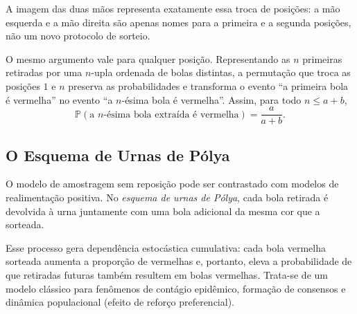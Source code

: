 \documentclass[12pt,portuguese]{article}
\let\leq\leqslant
\theoremstyle{definition}
\begin{document}
A imagem das duas mãos representa exatamente essa troca de posições: a mão esquerda e a mão direita são apenas nomes para a primeira e a segunda posições, não um novo protocolo de sorteio.

O mesmo argumento vale para qualquer posição. Representando as \(n\) primeiras retiradas por uma \(n\)-upla ordenada de bolas distintas, a permutação que troca as posições \(1\) e \(n\) preserva as probabilidades e transforma o evento ``a primeira bola é vermelha'' no evento ``a \(n\)-ésima bola é vermelha''. Assim, para todo \(n\leq a+b\),
\begin{equation}
  \mathbb{P}(\text{a } n\text{-ésima bola extraída é vermelha}) = \frac{a}{a+b}.
\end{equation}

\subsection{O Esquema de Urnas de Pólya}

O modelo de amostragem sem reposição pode ser contrastado com modelos de realimentação positiva. No \emph{esquema de urnas de Pólya}, cada bola retirada é devolvida à urna juntamente com 
uma bola adicional da mesma cor que a sorteada.

Esse processo gera dependência estocástica cumulativa: cada bola vermelha sorteada aumenta a proporção de vermelhas e, portanto, eleva a probabilidade de que retiradas futuras também resultem em bolas vermelhas. Trata-se de um modelo clássico para fenômenos de contágio epidêmico, formação de consensos e dinâmica populacional (efeito de reforço preferencial).
\end{document}
